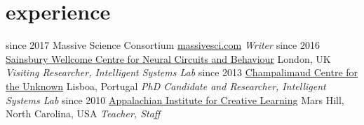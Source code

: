 \documentclass[]{friggeri-cv}
\begin{document}
\section{experience}

\begin{entrylist}
  \entry
    {since 2017}
    {Massive Science Consortium}
    {\href{massivesci.com}{massivesci.com}}
    {\emph{Writer}}
  \entry
    {since 2016}
    {\href{https://www.ucl.ac.uk/swc/}{Sainsbury Wellcome Centre for Neural Circuits and Behaviour}}
    {London, UK}
    {\emph{Visiting Researcher, Intelligent Systems Lab}}
  \entry
    {since 2013}
    {\href{http://neuro.fchampalimaud.org/en/research/investigators/research-groups/group/Kampff/}{Champalimaud Centre for the Unknown}}
    {Lisboa, Portugal}
    {\emph{PhD Candidate and Researcher, Intelligent Systems Lab}}
  \entry
    {since 2010}
    {\href{http://www.appalachianinstitute.org/}{Appalachian Institute for Creative Learning}}
    {Mars Hill, North Carolina, USA}
    {\emph{Teacher, Staff}}
\end{entrylist}

\newpage
\end{document}
